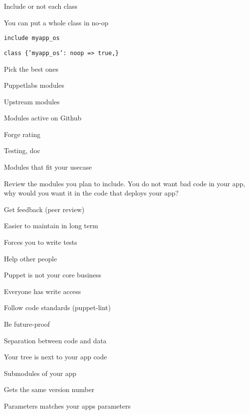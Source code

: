 \begin{iframe}
\item Include or not each class
\item You can put a whole class in no-op
\item{\texttt{include myapp\_os}}
\item{\texttt{class \{'myapp\_os': noop => true,\}}}
\end{iframe}


\begin{iframe}
\item Pick the best ones
\item Puppetlabs modules
\item Upstream modules
\item Modules active on Github
\item Forge rating
\item Testing, doc
\item Modules that fit your usecase
\end{iframe}

\begin{frame}\LARGE Review the modules you plan to include. You do not want bad code in your app, why would you want it in the code that deploys your app?\end{frame}

\begin{iframe}
\item Get feedback (peer review)
\item Easier to maintain in long term
\item Forces you to write tests
\item Help other people
\item Puppet is not your core business
\end{iframe}


\begin{iframe}
\item Everyone has write access
\item Follow code standards (puppet-lint)
\item Be future-proof
\item Separation between code and data
\end{iframe}

\begin{iframe}
\item Your tree is next to your app code
\item Submodules of your app
\item Gets the same version number
\item Parameters matches your apps parameters
\end{iframe}

